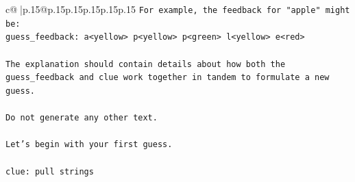 \documentclass{article}
\begin{document}
{\begin{supertabular}{c@{$\;$}|p{.15\linewidth}@{}p{.15\linewidth}p{.15\linewidth}p{.15\linewidth}p{.15\linewidth}p{.15\linewidth}}
{{{\texttt{For example, the feedback for "apple" might be:} \\
\texttt{guess\_feedback: a<yellow> p<yellow> p<green> l<yellow> e<red>} \\
\\ 
\texttt{The explanation should contain details about how both the guess\_feedback and clue work together in tandem to formulate a new guess.} \\
\\ 
\texttt{Do not generate any other text.} \\
\\ 
\texttt{Let's begin with your first guess.} \\
\\ 
\texttt{clue: pull strings} \\
            }
        }
    }
     \\ \\


\end{supertabular}}
\end{document}
